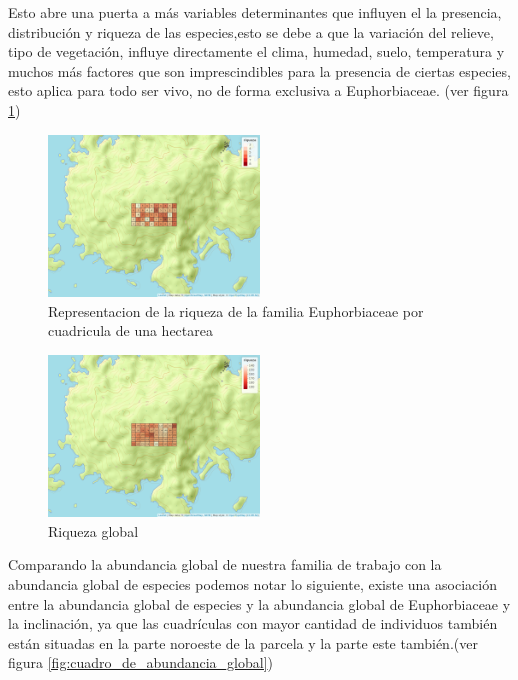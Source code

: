 \documentclass[11pt,]{article}
\begin{document}
Esto abre una puerta a más variables determinantes que influyen el la
presencia, distribución y riqueza de las especies,esto se debe a que la
variación del relieve, tipo de vegetación, influye directamente el
clima, humedad, suelo, temperatura y muchos más factores que son
imprescindibles para la presencia de ciertas especies, esto aplica para
todo ser vivo, no de forma exclusiva a Euphorbiaceae. (ver figura
\ref{fig:cuadro_de_riqueza_familia})

\begin{figure}
\centering
\includegraphics[width=0.50000\textwidth]{mapa_cuadros_riq_mi_familia.png}
\caption{\label{fig:cuadro_de_riqueza_familia}Representacion de la
riqueza de la familia Euphorbiaceae por cuadricula de una hectarea}
\end{figure}

\begin{figure}
\centering
\includegraphics[width=0.50000\textwidth]{mapa_cuadros_riq_global.png}
\caption{\label{fig:cuadro_riqueza_global}Riqueza global}
\end{figure}

Comparando la abundancia global de nuestra familia de trabajo con la
abundancia global de especies podemos notar lo siguiente, existe una
asociación entre la abundancia global de especies y la abundancia global
de Euphorbiaceae y la inclinación, ya que las cuadrículas con mayor
cantidad de individuos también están situadas en la parte noroeste de la
parcela y la parte este también.(ver figura
\ref{fig:cuadro_de_abundancia_global})
\end{document}
